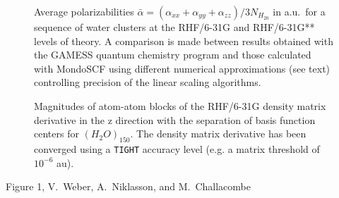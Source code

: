 \documentclass[prl,aps,twocolumn,showpacs,twocolumngrid,superbib]{revtex4}
\begin{document}
{\begin{figure}[h]
\caption{\protect Average polarizabilities $\bar{\alpha}=(\alpha_{xx}+\alpha_{yy}+\alpha_{zz})/3N_{H_20}$
         in a.u.~for a sequence of water clusters at the RHF/6-31G and RHF/6-31G** levels of theory.
         A comparison is made between results obtained with the {\sc GAMESS} quantum chemistry program
         \cite{gamess} and those calculated with {\sc MondoSCF} using different numerical approximations
         (see text) controlling precision of the linear scaling algorithms.}\label{tab:Polari_Values}


\caption{\protect
    Magnitudes of atom-atom blocks of the RHF/6-31G density matrix derivative
    in the z direction with the separation of basis function centers for $(H_2O)_{150}$.
    The density matrix derivative has been converged using a {\tt TIGHT} accuracy level (e.g. 
    a matrix threshold of $10^{-6}$ au).}\label{fig:DPrimeZ_150_6-31G}

\end{figure}

\clearpage

\begin{center}
Figure 1, V.~Weber, A.~Niklasson,  and M.~Challacombe \\[1.cm]
\end{center}

}
\end{document}
